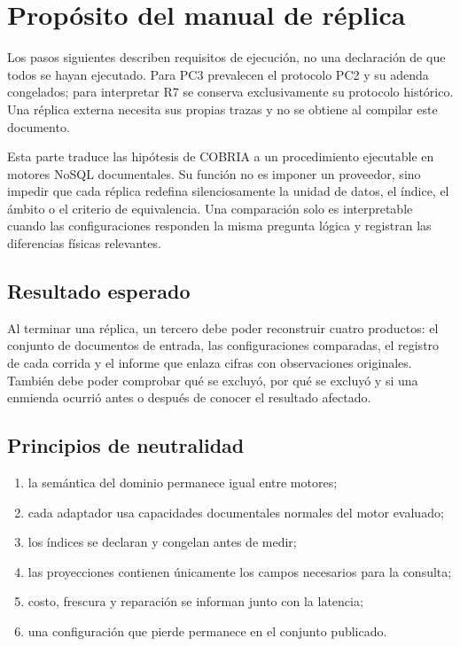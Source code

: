 \chapter{Propósito del manual de réplica}

Los pasos siguientes describen requisitos de ejecución, no una declaración de que
todos se hayan ejecutado. Para PC3 prevalecen el protocolo PC2 y su adenda congelados;
para interpretar R7 se conserva exclusivamente su protocolo histórico. Una réplica
externa necesita sus propias trazas y no se obtiene al compilar este documento.

Esta parte traduce las hipótesis de COBRIA a un procedimiento ejecutable en motores
NoSQL documentales. Su función no es imponer un proveedor, sino impedir que cada réplica
redefina silenciosamente la unidad de datos, el índice, el ámbito o el criterio de
equivalencia. Una comparación solo es interpretable cuando las configuraciones responden
la misma pregunta lógica y registran las diferencias físicas relevantes.

\section{Resultado esperado}

Al terminar una réplica, un tercero debe poder reconstruir cuatro productos: el conjunto
de documentos de entrada, las configuraciones comparadas, el registro de cada corrida y
el informe que enlaza cifras con observaciones originales. También debe poder comprobar
qué se excluyó, por qué se excluyó y si una enmienda ocurrió antes o después de conocer
el resultado afectado.

\section{Principios de neutralidad}

\begin{enumerate}[leftmargin=*]
  \item la semántica del dominio permanece igual entre motores;
  \item cada adaptador usa capacidades documentales normales del motor evaluado;
  \item los índices se declaran y congelan antes de medir;
  \item las proyecciones contienen únicamente los campos necesarios para la consulta;
  \item costo, frescura y reparación se informan junto con la latencia;
  \item una configuración que pierde permanece en el conjunto publicado.
\end{enumerate}

